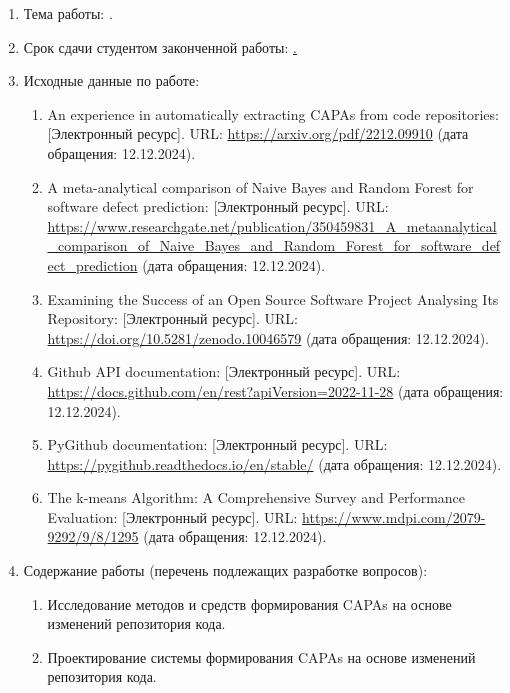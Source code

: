 \begin{enumerate}[1.]
\item Тема работы: {\expandafter \thesisTitle.}
\item Срок сдачи студентом законченной работы: \uline{\thesisDeadline.} 
\item Исходные данные по работе: \begin{enumerate}[label=\theenumi\arabic*.]
	\item An experience in automatically extracting CAPAs from code repositories: [Электронный ресурс]. URL: \url{https://arxiv.org/pdf/2212.09910} (дата обращения: 12.12.2024).
	\item A meta-analytical comparison of Naive Bayes and Random Forest for software defect prediction: [Электронный ресурс]. URL: \url{https://www.researchgate.net/publication/350459831_A_metaanalytical_comparison_of_Naive_Bayes_and_Random_Forest_for_software_defect_prediction} (дата обращения: 12.12.2024).
	\item Examining the Success of an Open Source Software Project Analysing Its Repository: [Электронный ресурс]. URL: \url{https://doi.org/10.5281/zenodo.10046579} (дата обращения: 12.12.2024).
	\item Github API documentation: [Электронный ресурс]. URL: \url{https://docs.github.com/en/rest?apiVersion=2022-11-28} (дата обращения: 12.12.2024).
	\item PyGithub documentation: [Электронный ресурс]. URL: \url{https://pygithub.readthedocs.io/en/stable/} (дата обращения: 12.12.2024).
	\item The k-means Algorithm: A Comprehensive Survey and Performance Evaluation: [Электронный ресурс]. URL: \url{https://www.mdpi.com/2079-9292/9/8/1295} (дата обращения: 12.12.2024).
\end{enumerate}
\printbibliographyTask %
\item Содержание работы (перечень подлежащих разработке вопросов):
\begin{enumerate}[label=\theenumi\arabic*.]
\item Исследование методов и средств формирования CAPAs на основе изменений репозитория кода.
\item Проектирование системы формирования CAPAs на основе изменений репозитория кода.

\end{enumerate}
\end{enumerate}
